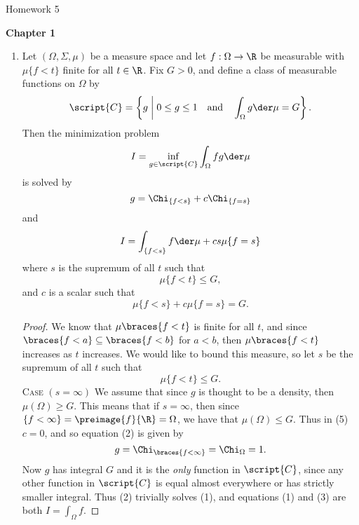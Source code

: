 \documentclass[12pt,letterpaper]{article}
\begin{document}
\pagestyle{fancy}
\begin{center}
{\Large Homework 5}%
\end{center}

\renewcommand{\B}{\bar{B}(\ell^\infty)}
\textbf{Chapter 1}

\begin{enumerate}

\item[] \vspace*{-24pt} 
	\begin{theorem*}
	Let $(\Omega, \Sigma, \mu)$ be a measure space and let $f:\Omega\to\R$ be measurable with $\mu\{f<t\}$ finite for all $t\in\R$. Fix $G>0$, and define a class of measurable functions on $\Omega$ by 
	$$\script{C}=\left\lbrace g \; \middle| \; 0\leq g\leq 1 \quad\text{and}\quad \int_\Omega g \der\mu = G\right\rbrace.$$
	Then the minimization problem 
	\setcounter{equation}{0}
	\begin{equation}
	I=\inf_{g\in\script{C}} \int_\Omega fg\der\mu 
	\end{equation}
	is solved by 
	\setcounter{equation}{1}
	\begin{equation}
	g=\Chi_{\{f<s\}} + c\Chi_{\{f=s\}}
	\end{equation}
	and
	\setcounter{equation}{2}
	\begin{equation}
	I=\int_{\{f<s\}} f\der\mu + cs\mu\{f=s\}
	\end{equation}
	where $s$ is the supremum of all $t$ such that 
	\setcounter{equation}{3}
	\begin{equation}
	\mu\{f<t\}\leq G,
	\end{equation}
	and $c$ is a scalar such that 
	\setcounter{equation}{4}
	\begin{equation}
	\mu\{f<s\} + c\mu\{f=s\} = G.
	\end{equation}
	\end{theorem*}
	\begin{proof}
	We know that $\mu\braces{f<t}$ is finite for all $t$, and since $\braces{f<a}\subseteq\braces{f<b}$ for $a<b$, then $\mu\braces{f<t}$ increases as $t$ increases. We would like to bound this measure, so let $s$ be the supremum of all $t$ such that 
	\setcounter{equation}{3}
	\begin{equation}
	\mu\{f<t\}\leq G.
	\end{equation}
	\textsc{Case} $(s=\infty)$ We assume that since $g$ is thought to be a density, then $\mu(\Omega)\geq G$. This means that if $s=\infty$, then since $\{f<\infty\}=\preimage{f}{\R}=\Omega$, we have that $\mu(\Omega)\leq G$. Thus in (5) $c=0$, and so equation (2) is given by 
	$$g=\Chi_{\braces{f<\infty}}=\Chi_\Omega=1.$$
	Now $g$ has integral $G$ and it is the \emph{only} function in $\script{C}$, since any other function in $\script{C}$ is equal almost everywhere or has strictly smaller integral. Thus (2) trivially solves (1), and equations (1) and (3) are both $I=\int_\Omega f$. 
	

\end{proof}
\end{enumerate}
\end{document}
